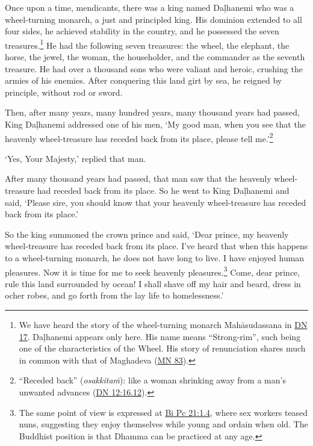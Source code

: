 \documentclass[12pt,openany]{book}%
\begin{document}
Once upon a time, mendicants, there was a king named \textsanskrit{Daḷhanemi} who was a wheel-turning monarch, a just and principled king. His dominion extended to all four sides, he achieved stability in the country, and he possessed the seven treasures.\footnote{We have heard the story of the wheel-turning monarch \textsanskrit{Mahāsudassana} in \href{https://suttacentral.net/dn17/en/sujato}{DN 17}. \textsanskrit{Daḷhanemi} appears only here. His name means “Strong-rim”, such being one of the characteristics of the Wheel. His story of renunciation shares much in common with that of Maghadeva (\href{https://suttacentral.net/mn83/en/sujato}{MN 83}). } He had the following seven treasures: the wheel, the elephant, the horse, the jewel, the woman, the householder, and the commander as the seventh treasure. He had over a thousand sons who were valiant and heroic, crushing the armies of his enemies. After conquering this land girt by sea, he reigned by principle, without rod or sword. 

Then, after many years, many hundred years, many thousand years had passed, King \textsanskrit{Daḷhanemi} addressed one of his men, ‘My good man, when you see that the heavenly wheel-treasure has receded back from its place, please tell me.’\footnote{“Receded back” (\textit{\textsanskrit{osakkitaṁ}}): like a woman shrinking away from a man’s unwanted advances (\href{https://suttacentral.net/dn12/en/sujato\#16.12}{DN 12:16.12}). } 

‘Yes, Your Majesty,’ replied that man. 

After many thousand years had passed, that man saw that the heavenly wheel-treasure had receded back from its place. So he went to King \textsanskrit{Daḷhanemi} and said, ‘Please sire, you should know that your heavenly wheel-treasure has receded back from its place.’ 

So the king summoned the crown prince and said, ‘Dear prince, my heavenly wheel-treasure has receded back from its place. I’ve heard that when this happens to a wheel-turning monarch, he does not have long to live. I have enjoyed human pleasures. Now it is time for me to seek heavenly pleasures.\footnote{The same point of view is expressed at \href{https://suttacentral.net/pli-tv-bi-vb-pc21/en/sujato\#1.4}{Bi Pc 21:1.4}, where sex workers teased nuns, suggesting they enjoy themselves while young and ordain when old. The Buddhist position is that Dhamma can be practiced at any age. } Come, dear prince, rule this land surrounded by ocean! I shall shave off my hair and beard, dress in ocher robes, and go forth from the lay life to homelessness.’ 
\end{document}
